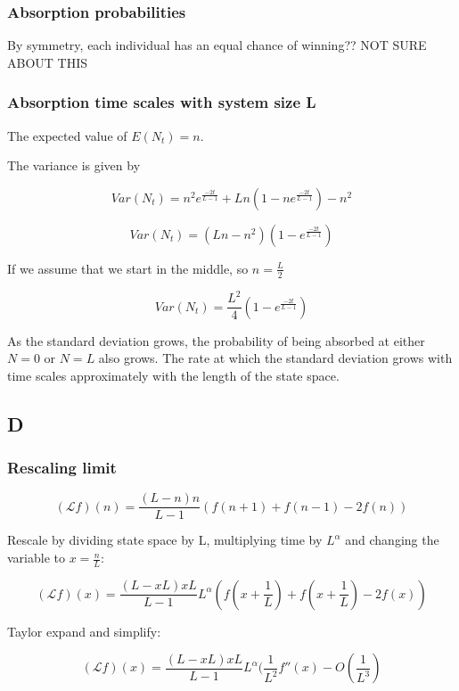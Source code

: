 \documentclass{article}
\begin{document}
\subsubsection{Absorption probabilities}

By symmetry, each individual has an equal chance of winning?? NOT SURE ABOUT THIS

\subsubsection{Absorption time scales with system size L}

The expected value of $E(N_t)=n$.

The variance is given by 

$$Var(N_t) = n^2e^{\frac{-2t}{L-1}} + Ln(1-ne^{\frac{-2t}{L-1}}) - n^2$$

$$Var(N_t) = (Ln - n^2)(1- e^{\frac{-2t}{L-1}})$$

If we assume that we start in the middle, so $n=\frac{L}{2}$

$$Var(N_t) = \frac{L^2}{4}(1- e^{\frac{-2t}{L-1}})$$

As the standard deviation grows, the probability of being absorbed at either $N=0$ or $N=L$ also grows. The rate at which the standard deviation grows with time scales approximately with the length of the state space. 









\subsection{D}

\subsubsection{Rescaling limit}

$$(\mathcal{L}f)(n) = \frac{(L-n)n}{L-1}(f(n+1) + f(n-1) - 2f(n))$$

Rescale by dividing state space by L, multiplying time by $L^\alpha$ and changing the variable to $x=\frac{n}{L}$:

$$(\mathcal{L}f)(x) = \frac{(L-xL)xL}{L-1}L^\alpha(f(x+\frac{1}{L}) + f(x+\frac{1}{L}) - 2f(x))$$

Taylor expand and simplify:

$$(\mathcal{L}f)(x) = \frac{(L-xL)xL}{L-1}L^\alpha(\frac{1}{L^2}f''(x) - O(\frac{1}{L^3})$$
\end{document}
